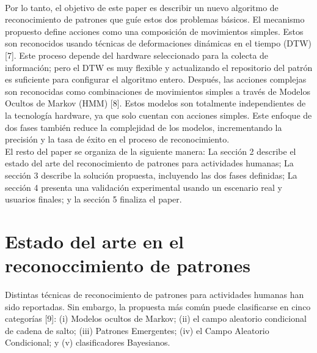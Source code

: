\documentclass{article}
\begin{document}
\\
Por lo tanto, el objetivo de este paper es describir un nuevo algoritmo de reconocimiento de patrones que guíe estos dos problemas básicos. El mecanismo propuesto define acciones como una composición de movimientos simples. Estos son reconocidos usando técnicas de deformaciones dinámicas en el tiempo (DTW) [7]. Este proceso depende del hardware seleccionado para la colecta de información; pero el DTW  es muy flexible y actualizando el repositorio del patrón es suficiente para configurar el algoritmo entero. Después, las acciones complejas son reconocidas como combinaciones de movimientos simples a través de Modelos Ocultos de Markov (HMM) [8]. Estos modelos son totalmente independientes de la tecnología hardware, ya que solo cuentan con acciones simples. Este enfoque de dos fases también reduce la complejidad de los modelos, incrementando la precisión y la tasa de éxito en el proceso de reconocimiento.
\\
El resto del paper se organiza de la siguiente manera: La sección 2 describe el estado del arte del reconocimiento de patrones para actividades humanas; La sección 3 describe la solución propuesta, incluyendo las dos fases definidas; La sección 4 presenta una validación experimental usando un escenario real y usuarios finales; y la sección 5 finaliza el paper.

\section{Estado del arte en el reconoccimiento de patrones}

Distintas técnicas de reconocimiento de patrones para actividades humanas han sido reportadas. Sin embargo, la propuesta más común puede clasificarse en cinco categorías [9]: (i) Modelos ocultos de Markov; (ii) el campo aleatorio condicional de cadena de salto; (iii) Patrones Emergentes; (iv) el Campo Aleatorio Condicional; y (v) clasificadores Bayesianos.
\end{document}
